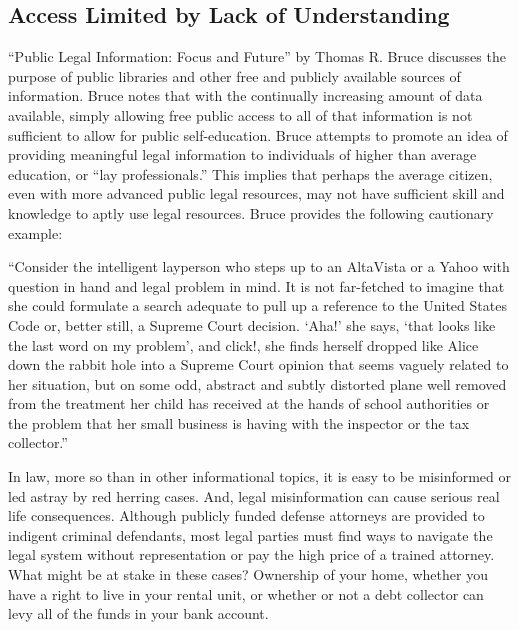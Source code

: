 \documentclass[11pt]{article}
\begin{document}
\subsection{Access Limited by Lack of Understanding}
``Public Legal Information:  Focus and Future'' by Thomas R. Bruce discusses the purpose of public libraries and other free and publicly available sources of information.  Bruce notes that with the continually increasing amount of data available, simply allowing free public access to all of that information is not sufficient to allow for public self-education.  Bruce attempts to promote an idea of providing meaningful legal information to individuals of higher than average education, or ``lay professionals.''  This implies that perhaps the average citizen, even with more advanced public legal resources, may not have sufficient skill and knowledge to aptly use legal resources.  Bruce provides the following cautionary example:

\hangindent=0.5cm
``Consider the intelligent layperson who steps up to an AltaVista or a Yahoo with question in hand and legal problem in mind.  It is not far-fetched to imagine that she could formulate a search adequate to pull up a reference to the United States Code or, better still, a Supreme Court decision.  `Aha!' she says, `that looks like the last word on my problem', and click!, she finds herself dropped like Alice down the rabbit hole into a Supreme Court opinion that seems vaguely related to her situation, but on some odd, abstract and subtly distorted plane well removed from the treatment her child has received at the hands of school authorities or the problem that her small business is having with the inspector or the tax collector.'' \cite[p.~33]{Bruce2000}

In law, more so than in other informational topics, it is easy to be misinformed or led astray by red herring cases.  And, legal misinformation can cause serious real life consequences.  Although publicly funded defense attorneys are provided to indigent criminal defendants, most legal parties must find ways to navigate the legal system without representation or pay the high price of a trained attorney.  What might be at stake in these cases?  Ownership of your home, whether you have a right to live in your rental unit, or whether or not a debt collector can levy all of the funds in your bank account.   
\end{document}
